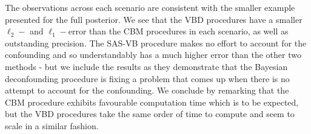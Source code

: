 \documentclass[11pt]{article}
\begin{document}
The observations across each scenario are consistent with the smaller example presented for the full posterior. We see that the VBD procedures have a smaller $\ell_2-$ and $\ell_1-$error than the CBM procedures in each scenario, as well as outstanding precision. The SAS-VB procedure makes no effort to account for the confounding and so understandably has a much higher error than the other two methods - but we include the results as they demonstrate that the Bayesian deconfounding procedure is fixing a problem that comes up when there is no attempt to account for the confounding. We conclude by remarking that the CBM procedure exhibits favourable computation time which is to be expected, but the VBD procedures take the same order of time to compute and seem to scale in a similar fashion.

\begin{table}
\end{table}
\end{document}
